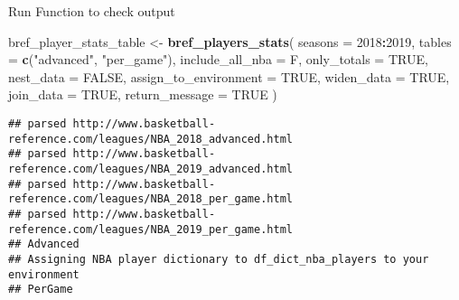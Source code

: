 \documentclass[]{article}
\newenvironment{Shaded}{\begin{snugshade}}{\end{snugshade}}
\newcommand{\KeywordTok}[1]{\textcolor[rgb]{0.13,0.29,0.53}{\textbf{#1}}}
\newcommand{\DataTypeTok}[1]{\textcolor[rgb]{0.13,0.29,0.53}{#1}}
\newcommand{\DecValTok}[1]{\textcolor[rgb]{0.00,0.00,0.81}{#1}}
\newcommand{\StringTok}[1]{\textcolor[rgb]{0.31,0.60,0.02}{#1}}
\newcommand{\OtherTok}[1]{\textcolor[rgb]{0.56,0.35,0.01}{#1}}
\newcommand{\OperatorTok}[1]{\textcolor[rgb]{0.81,0.36,0.00}{\textbf{#1}}}
\newcommand{\NormalTok}[1]{#1}
\begin{document}
\begin{Shaded}
\begin{Highlighting}[]
{{{\NormalTok{    all_data <-}
\StringTok{      }\NormalTok{all_data }\OperatorTok{%>%}
\StringTok{      }\KeywordTok{mutate}\NormalTok{(}\DataTypeTok{yearSeason =}\NormalTok{ slugSeason }\OperatorTok{%>%}\StringTok{ }\KeywordTok{substr}\NormalTok{(}\DecValTok{1}\NormalTok{, }\DecValTok{4}\NormalTok{) }\OperatorTok{%>%}\StringTok{ }\KeywordTok{as.numeric}\NormalTok{() }\OperatorTok{+}\StringTok{ }\DecValTok{1}\NormalTok{)}

\NormalTok{    all_data}
\NormalTok{  \}}
\end{Highlighting}
\end{Shaded}

Run Function to check output

\begin{Shaded}
\begin{Highlighting}[]
\NormalTok{bref_player_stats_table <-}
\StringTok{  }\KeywordTok{bref_players_stats}\NormalTok{(}
    \DataTypeTok{seasons =} \DecValTok{2018}\OperatorTok{:}\DecValTok{2019}\NormalTok{,}
    \DataTypeTok{tables =} \KeywordTok{c}\NormalTok{(}\StringTok{"advanced"}\NormalTok{, }\StringTok{"per_game"}\NormalTok{),}
    \DataTypeTok{include_all_nba =}\NormalTok{ F,}
    \DataTypeTok{only_totals =} \OtherTok{TRUE}\NormalTok{,}
    \DataTypeTok{nest_data =} \OtherTok{FALSE}\NormalTok{,}
    \DataTypeTok{assign_to_environment =} \OtherTok{TRUE}\NormalTok{,}
    \DataTypeTok{widen_data =} \OtherTok{TRUE}\NormalTok{,}
    \DataTypeTok{join_data =} \OtherTok{TRUE}\NormalTok{,}
    \DataTypeTok{return_message =} \OtherTok{TRUE}
\NormalTok{  )}
\end{Highlighting}
\end{Shaded}

\begin{verbatim}
## parsed http://www.basketball-reference.com/leagues/NBA_2018_advanced.html
## parsed http://www.basketball-reference.com/leagues/NBA_2019_advanced.html
## parsed http://www.basketball-reference.com/leagues/NBA_2018_per_game.html
## parsed http://www.basketball-reference.com/leagues/NBA_2019_per_game.html
## Advanced
## Assigning NBA player dictionary to df_dict_nba_players to your environment
## PerGame
\end{verbatim}

\begin{Shaded}
\end{Shaded}
\end{document}

